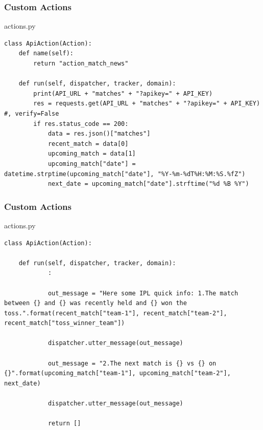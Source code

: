  \begin{frame}[fragile]\frametitle{Custom Actions}

actions.py

\begin{lstlisting}
class ApiAction(Action):
    def name(self):
        return "action_match_news"

    def run(self, dispatcher, tracker, domain):
        print(API_URL + "matches" + "?apikey=" + API_KEY)
        res = requests.get(API_URL + "matches" + "?apikey=" + API_KEY) #, verify=False
        if res.status_code == 200:
            data = res.json()["matches"]
            recent_match = data[0]
            upcoming_match = data[1]
            upcoming_match["date"] = datetime.strptime(upcoming_match["date"], "%Y-%m-%dT%H:%M:%S.%fZ")
            next_date = upcoming_match["date"].strftime("%d %B %Y")

\end{lstlisting}
\end{frame}

 \begin{frame}[fragile]\frametitle{Custom Actions}

actions.py

\begin{lstlisting}
class ApiAction(Action):

    def run(self, dispatcher, tracker, domain):
			:

            out_message = "Here some IPL quick info: 1.The match between {} and {} was recently held and {} won the toss.".format(recent_match["team-1"], recent_match["team-2"], recent_match["toss_winner_team"])

            dispatcher.utter_message(out_message)

            out_message = "2.The next match is {} vs {} on {}".format(upcoming_match["team-1"], upcoming_match["team-2"], next_date)

            dispatcher.utter_message(out_message)

            return []
\end{lstlisting}
\end{frame}

